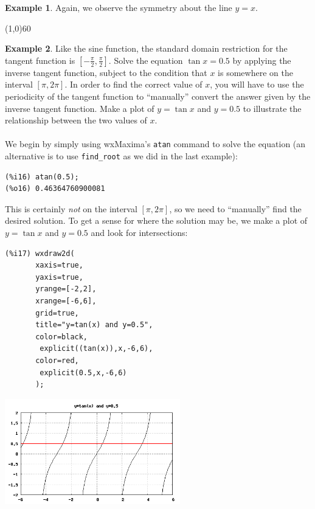 \documentclass[10.5pt,twoside]{report}
\theoremstyle{definition}
\newtheorem{exmp}{Example}[section]
\begin{document}
\begin{exmp}
Again, we observe the symmetry about the line $y=x$.


\end{exmp}

\line(1,0){60}
\linethickness{0.5mm}


\begin{exmp}

Like the sine function, the standard domain restriction for the tangent function is $[-\frac{\pi}{2},\frac{\pi}{2}]$.  Solve the equation $\tan{x}=0.5$ by applying the inverse tangent function, subject to the condition that $x$ is somewhere on the interval $[\pi,2\pi]$.  In order to find the correct value of $x$, you will have to use the periodicity of the tangent function to ``manually'' convert the answer given by the inverse tangent function.  Make a plot of $y=\tan{x}$ and $y=0.5$ to illustrate the relationship between the two values of $x$.  \\
${}$\\

We begin by simply using wxMaxima's \verb|atan| command to solve the equation (an alternative is to use \verb|find_root| as we did in the last example):

\begin{verbatim}
(%i16) atan(0.5);
(%o16) 0.46364760900081
\end{verbatim}

This is certainly \textit{not} on the interval $[\pi,2\pi]$, so we need to ``manually'' find the desired solution.  To get a sense for where the solution may be, we make a plot of $y=\tan{x}$ and $y=0.5$ and look for intersections:

\begin{verbatim}
(%i17) wxdraw2d(
       xaxis=true,
       yaxis=true,
       yrange=[-2,2],
       xrange=[-6,6],
       grid=true,
       title="y=tan(x) and y=0.5",
       color=black,
        explicit((tan(x)),x,-6,6),
       color=red,
        explicit(0.5,x,-6,6)
       );
\end{verbatim}

\includegraphics[width=3in]{example_2_4_3}


\end{exmp}
\end{document}
